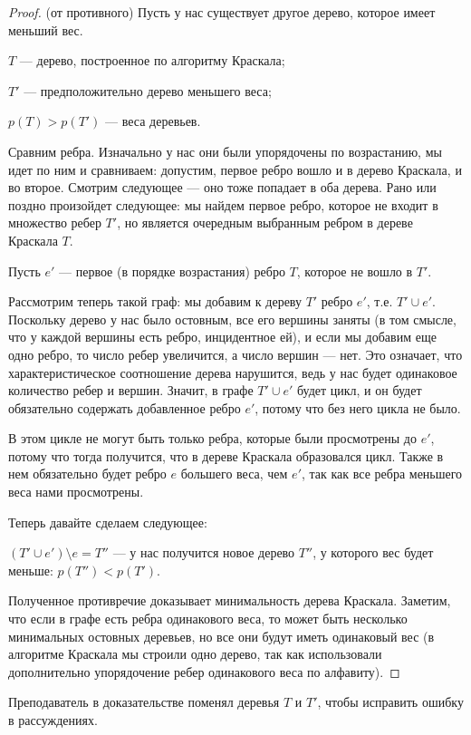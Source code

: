 \documentclass[russian]{lecture-notes}
\begin{document}
	\begin{proof} (от противного)
		Пусть у нас существует другое дерево, которое имеет меньший вес.
		
		$T$ --- дерево, построенное по алгоритму Краскала;
		
		$T'$ --- предположительно дерево меньшего веса;
		
		$p(T) > p(T')$ --- веса деревьев.
		
		Сравним ребра. Изначально у нас они были упорядочены по возрастанию, мы идет по ним и сравниваем: допустим, первое ребро вошло и в дерево Краскала, и во второе. Смотрим следующее --- оно тоже попадает в оба дерева. Рано или поздно произойдет следующее: мы найдем первое ребро, которое не входит в множество ребер $T'$, но является очередным выбранным ребром в дереве Краскала $T$.
		
		Пусть $e'$ --- первое (в порядке возрастания) ребро $T$, которое не вошло в $T'$. 
		
		Рассмотрим теперь такой граф: мы добавим к  дереву $T'$ ребро $e'$, т.е. $T' \cup e'$. Поскольку дерево у нас было остовным, все его вершины заняты (в том смысле, что у каждой вершины есть ребро, инцидентное ей), и если мы добавим еще одно ребро, то число ребер увеличится, а число вершин --- нет. Это означает, что характеристическое соотношение дерева нарушится, ведь у нас будет одинаковое количество ребер и вершин. Значит, в графе $T' \cup e'$ будет цикл, и он будет обязательно содержать добавленное ребро $e'$, потому что без него цикла не было.
		
		В этом цикле не могут быть только ребра, которые были просмотрены до $e'$, потому что тогда получится, что в дереве Краскала образовался цикл. Также в нем обязательно будет ребро $e$ большего веса, чем $e'$, так как все ребра меньшего веса нами просмотрены.
		
		Теперь давайте сделаем следующее: 
		
		$(T' \cup e') \setminus e = T''$
		--- у нас получится новое дерево $T''$, у которого вес будет меньше: $p(T'') < p(T')$. 
		
		Полученное противречие доказывает минимальность дерева Краскала. Заметим, что если в графе есть ребра одинакового веса, то может быть несколько минимальных остовных деревьев, но все они будут иметь одинаковый вес (в алгоритме Краскала мы строили одно дерево, так как использовали дополнительно упорядочение ребер одинакового веса по алфавиту).
	\end{proof}
	\begin{remark} [от редактора]
		Преподаватель в доказательстве поменял деревья $T$ и $T'$, чтобы исправить ошибку в рассуждениях.
		
	\end{remark}
	
\end{document}

